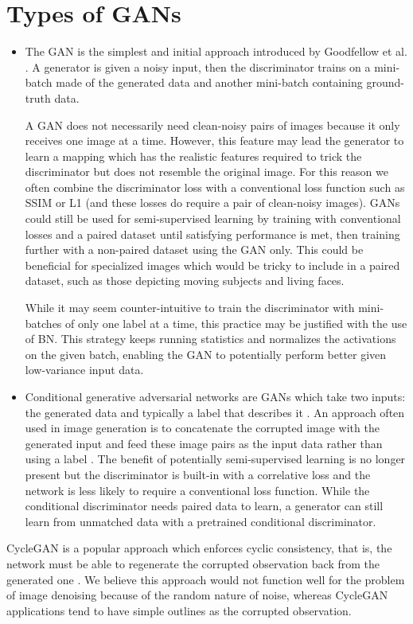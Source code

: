 \section{Types of GANs}

\begin{itemize}
  \item The \acs{GAN} is the simplest and initial approach introduced by Goodfellow et al. \cite{gan}. A generator is given a noisy input, then the discriminator trains on a mini-batch made of the generated data and another mini-batch containing ground-truth data.

A \ac{GAN} does not necessarily need clean-noisy pairs of images because it only receives one image at a time. However, this feature may lead the generator to learn a mapping which has the realistic features required to trick the discriminator but does not resemble the original image. For this reason we often combine the discriminator loss with a conventional loss function such as SSIM or L1 (and these losses do require a pair of clean-noisy images). \acp{GAN} could still be used for semi-supervised learning by training with conventional losses and a paired dataset until satisfying performance is met, then training further with a non-paired dataset using the GAN only. This could be beneficial for specialized images which would be tricky to include in a paired dataset, such as those depicting moving subjects and living faces.

While it may seem counter-intuitive to train the discriminator with mini-batches of only one label at a time, this practice may be justified with the use of \acl{BN}. This strategy keeps running statistics and normalizes the activations on the given batch, enabling the \ac{GAN} to potentially perform better given low-variance input data. \cite{gantechniques} %
  \item Conditional generative adversarial networks are \acsp{GAN} which take two inputs: the generated data and typically a label that describes it \cite{cgan}. An approach often used in image generation is to concatenate the corrupted image with the generated input and feed these image pairs as the input data rather than using a label \cite{pix2pix}\cite{cyclegan}\cite{pix2pixhd}. The benefit of potentially semi-supervised learning is no longer present but the discriminator is built-in with a correlative loss and the network is less likely to require a conventional loss function. While the conditional discriminator needs paired data to learn, a generator can still learn from unmatched data with a pretrained conditional discriminator.
\end{itemize}
CycleGAN is a popular approach which enforces cyclic consistency, that is, the network must be able to regenerate the corrupted observation back from the generated one \cite{cyclegan}. We believe this approach would not function well for the problem of image denoising because of the random nature of noise, whereas CycleGAN applications tend to have simple outlines as the corrupted observation.

